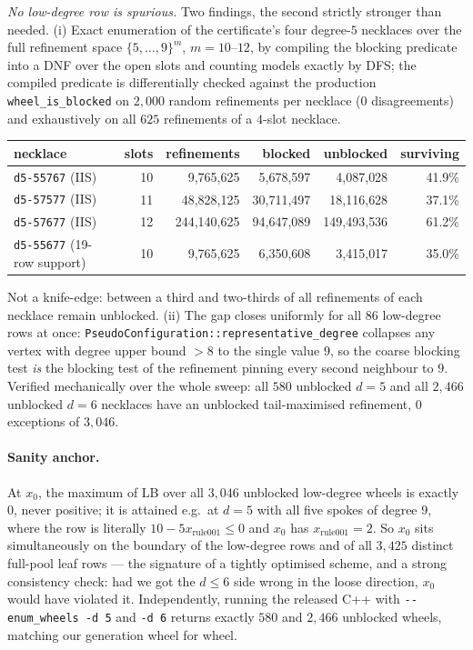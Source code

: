 \documentclass[11pt]{article}
\theoremstyle{definition}
\begin{document}
\emph{No low-degree row is spurious.} Two findings, the second strictly stronger than
needed. (i) Exact enumeration of the certificate's four degree-$5$ necklaces over the
full refinement space $\{5,\dots,9\}^m$, $m=10$--$12$, by compiling the blocking
predicate into a DNF over the open slots and counting models exactly by DFS; the
compiled predicate is differentially checked against the production
\texttt{wheel\_is\_blocked} on $2{,}000$ random refinements per necklace ($0$
disagreements) and exhaustively on all $625$ refinements of a $4$-slot necklace.

\begin{center}
\begin{tabular}{lrrrrr}
\toprule
necklace & slots & refinements & blocked & unblocked & surviving \\
\midrule
\texttt{d5-55767} (IIS) & 10 & 9{,}765{,}625   & 5{,}678{,}597  & 4{,}087{,}028   & 41.9\% \\
\texttt{d5-57577} (IIS) & 11 & 48{,}828{,}125  & 30{,}711{,}497 & 18{,}116{,}628  & 37.1\% \\
\texttt{d5-57677} (IIS) & 12 & 244{,}140{,}625 & 94{,}647{,}089 & 149{,}493{,}536 & 61.2\% \\
\texttt{d5-55677} (19-row support) & 10 & 9{,}765{,}625 & 6{,}350{,}608 & 3{,}415{,}017 & 35.0\% \\
\bottomrule
\end{tabular}
\end{center}

Not a knife-edge: between a third and two-thirds of all refinements of each necklace
remain unblocked. (ii) The gap closes uniformly for all $86$ low-degree rows at once:
\texttt{PseudoConfiguration::representative\_degree} collapses any vertex with degree
upper bound $>8$ to the single value $9$, so the coarse blocking test \emph{is} the
blocking test of the refinement pinning every second neighbour to $9$. Verified
mechanically over the whole sweep: all $580$ unblocked $d=5$ and all $2{,}466$
unblocked $d=6$ necklaces have an unblocked tail-maximised refinement, $0$ exceptions
of $3{,}046$.

\paragraph{Sanity anchor.} At $x_0$, the maximum of $\mathrm{LB}$ over all $3{,}046$
unblocked low-degree wheels is exactly $0$, never positive; it is attained e.g.\ at
$d=5$ with all five spokes of degree $9$, where the row is literally
$10 - 5x_{\text{rule001}} \le 0$ and $x_0$ has $x_{\text{rule001}}=2$. So $x_0$ sits
simultaneously on the boundary of the low-degree rows and of all $3{,}425$ distinct
full-pool leaf rows --- the signature of a tightly optimised scheme, and a strong
consistency check: had we got the $d\le 6$ side wrong in the loose direction, $x_0$
would have violated it. Independently, running the released C++ with
\texttt{-{}-enum\_wheels -d 5} and \texttt{-d 6} returns exactly $580$ and $2{,}466$
unblocked wheels, matching our generation wheel for wheel.
\end{document}
